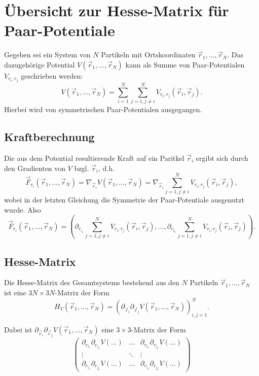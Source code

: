 \documentclass{scrartcl}
\begin{document}
\section*{Übersicht zur Hesse-Matrix für Paar-Potentiale}

Gegeben sei ein System von \(N\) Partikeln mit Ortskoordinaten \(\vec{r}_1, \dots, \vec{r}_N\). Das dazugehörige Potential \(V(\vec{r}_1, \dots, \vec{r}_N)\) kann als Summe von Paar-Potentialen \(V_{r_i, r_j}\) geschrieben werden:
\[V(\vec{r}_1, \dots, \vec{r}_N) = \sum_{i=1}^N \sum_{j=1, j\neq i}^N V_{r_i, r_j}(\vec{r}_i, \vec{r}_j). \]
Hierbei wird von symmetrischen Paar-Potentialen ausgegangen.

\subsection*{Kraftberechnung}
\label{sec:kraftberechnung}

Die aus dem Potential resultierende Kraft auf ein Paritkel \(\vec{r}_i\) ergibt sich durch den Gradienten von \(V\) bzgl. \(\vec{r}_i\), d.h.
\[\vec{F}_{r_i} (\vec{r}_1, \dots, \vec{r}_N) = \nabla_{\vec{r}_i} V(\vec{r}_1, \dots, \vec{r}_N) = \nabla_{\vec{r}_i} \sum_{j=1, j\neq i}^N V_{r_i, r_j}(\vec{r}_i, \vec{r}_j), \]
wobei in der letzten Gleichung die Symmetrie der Paar-Potentiale ausgenutzt wurde.
Also
\[ \vec{F}_{r_i} (\vec{r}_1, \dots, \vec{r}_N) = \left( \partial_{r_{i_1}} \sum_{j=1, j\neq i}^N V_{r_i, r_j}(\vec{r}_i, \vec{r}_j), \dots, \partial_{r_{i_3}} \sum_{j=1, j\neq i}^N V_{r_i, r_j}(\vec{r}_i, \vec{r}_j) \right).\]

\subsection*{Hesse-Matrix}
\label{sec:hesse-matrix}

Die Hesse-Matrix des Gesamtsystems bestehend aus den \(N\) Partikeln \(\vec{r}_1, \dots, \vec{r}_N\) ist eine \(3N \times 3N\)-Matrix der Form
\[H_V(\vec{r}_1, \dots, \vec{r}_N) = \left( \partial_{\vec{r}_i} \partial_{\vec{r}_j} V(\vec{r}_1, \dots, \vec{r}_N) \right)_{i,j = 1}^N. \]

Dabei ist \(\partial_{\vec{r}_i} \partial_{\vec{r}_j} V(\vec{r}_1, \dots, \vec{r}_N)\) eine \(3\times 3\)-Matrix der Form
\[
\begin{pmatrix}
\partial_{r_{i_1}}\partial_{r_{j_1}} V(\dots) & \dots & \partial_{r_{i_1}}\partial_{r_{j_1}} V(\dots) \\
\vdots & \ddots & \vdots \\
\partial_{r_{i_1}}\partial_{r_{j_1}} V(\dots) & \dots & \partial_{r_{i_1}}\partial_{r_{j_1}} V(\dots)
\end{pmatrix}
\]
\end{document}
